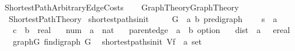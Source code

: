 %
\begin{isabellebody}%
\def\isabellecontext{Shortest{\isacharunderscore}Path{\isacharunderscore}Arbitrary{\isacharunderscore}Edge{\isacharunderscore}Costs}%
%
\isadelimtheory
%
\endisadelimtheory
%
\isatagtheory
{}\isamarkupfalse%
\ Shortest{\isacharunderscore}Path{\isacharunderscore}Arbitrary{\isacharunderscore}Edge{\isacharunderscore}Costs\isanewline
\isanewline
\isanewline
{}\ \isanewline
\ \ {\isachardoublequoteopen}{\isachardot}{\isachardot}{\isacharslash}Graph{\isacharunderscore}Theory{\isacharslash}Graph{\isacharunderscore}Theory{\isachardoublequoteclose}\isanewline
\ \ {\isachardoublequoteopen}Shortest{\isacharunderscore}Path{\isacharunderscore}Theory{\isachardoublequoteclose}\isanewline
{}%
\endisatagtheory
{\isafoldtheory}%
%
\isadelimtheory
\isanewline
%
\endisadelimtheory
\isanewline
\isanewline
{}\isamarkupfalse%
\ shortest{\isacharunderscore}paths{\isacharunderscore}init\ {\isacharequal}\ \isanewline
\ \ \ G\ {\isacharcolon}{\isacharcolon}\ {\isachardoublequoteopen}{\isacharparenleft}{\isacharprime}a{\isacharcomma}\ {\isacharprime}b{\isacharparenright}\ pre{\isacharunderscore}digraph{\isachardoublequoteclose}\ {\isacharparenleft}\isanewline
\ \ \ s\ {\isacharcolon}{\isacharcolon}\ {\isachardoublequoteopen}{\isacharprime}a{\isachardoublequoteclose}\isanewline
\ \ \ c\ {\isacharcolon}{\isacharcolon}\ {\isachardoublequoteopen}{\isacharprime}b\ {\isasymRightarrow}\ real{\isachardoublequoteclose}\isanewline
\ \ \ num\ {\isacharcolon}{\isacharcolon}\ {\isachardoublequoteopen}{\isacharprime}a\ {\isasymRightarrow}\ nat{\isachardoublequoteclose}\isanewline
\ \ \ parent{\isacharunderscore}edge\ {\isacharcolon}{\isacharcolon}\ {\isachardoublequoteopen}{\isacharprime}a\ {\isasymRightarrow}\ {\isacharprime}b\ option{\isachardoublequoteclose}\isanewline
\ \ \ dist\ {\isacharcolon}{\isacharcolon}\ {\isachardoublequoteopen}{\isacharprime}a\ \ {\isasymRightarrow}\ ereal{\isachardoublequoteclose}\isanewline
\ \ \ graphG{\isacharcolon}\ {\isachardoublequoteopen}fin{\isacharunderscore}digraph\ G{\isachardoublequoteclose}\isanewline
\isanewline
{}\isamarkupfalse%
\ {\isacharparenleft}\ shortest{\isacharunderscore}paths{\isacharunderscore}init{\isacharparenright}\ V\isactrlsub f\ {\isacharcolon}{\isacharcolon}\ {\isachardoublequoteopen}{\isacharprime}a\ set{\isachardoublequoteclose}\ \isanewline

\end{isabellebody}
